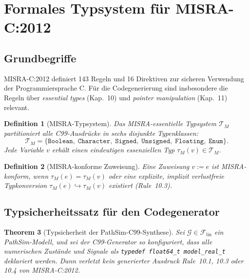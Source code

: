 ﻿\documentclass[12pt,a4paper]{article}
\newtheorem{theorem}{Theorem}[section]
\newtheorem{definition}[theorem]{Definition}
\theoremstyle{definition}
\begin{document}
\section{Formales Typsystem für MISRA-C:2012}
\label{sec:misra}


\subsection{Grundbegriffe}

MISRA-C:2012 \cite{misra2012} definiert 143 Regeln und 16 Direktiven zur
sicheren Verwendung der Programmiersprache C. Für die Codegenerierung sind
insbesondere die Regeln über \emph{essential types} (Kap.~10) und
\emph{pointer manipulation} (Kap.~11) relevant.

\begin{definition}[MISRA-Typsystem]
\label{def:misra-types}
Das \emph{MISRA-essentielle Typsystem} $\mathcal{T}_M$ partitioniert alle
C99-Ausdrücke in sechs disjunkte Typenklassen:
\[
  \mathcal{T}_M = \{\texttt{Boolean},\; \texttt{Character},\; \texttt{Signed},\;
  \texttt{Unsigned},\; \texttt{Floating},\; \texttt{Enum}\}.
\]
Jede Variable $v$ erhält einen eindeutigen essenziellen Typ
$\tau_M(v) \in \mathcal{T}_M$.
\end{definition}

\begin{definition}[MISRA-konforme Zuweisung]
\label{def:misra-assign}
Eine Zuweisung $v := e$ ist \emph{MISRA-konform}, wenn
$\tau_M(e) = \tau_M(v)$ oder eine explizite, implizit verlustfreie
Typkonversion $\tau_M(e) \hookrightarrow \tau_M(v)$ existiert (Rule~10.3).
\end{definition}

\subsection{Typsicherheitssatz für den Codegenerator}

\begin{theorem}[Typsicherheit der PathSim-C99-Synthese]
\label{thm:typesafe}
Sei $\mathcal{G} \in \mathcal{F}_{\mathrm{lin}}$ ein PathSim-Modell, und sei
der C99-Generator so konfiguriert, dass alle numerischen Zustände und Signale
als \texttt{typedef float64\_t model\_real\_t} deklariert werden. Dann verletzt
kein generierter Ausdruck Rule~10.1, 10.3 oder 10.4 von MISRA-C:2012.
\end{theorem}
\end{document}
